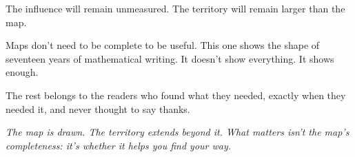 The influence will remain unmeasured. The territory will remain larger than the map.

Maps don't need to be complete to be useful. This one shows the shape of seventeen years of mathematical writing. It doesn't show everything. It shows enough.

The rest belongs to the readers who found what they needed, exactly when they needed it, and never thought to say thanks.

\bigskip

\textit{The map is drawn. The territory extends beyond it. What matters isn't the map's completeness: it's whether it helps you find your way.}


